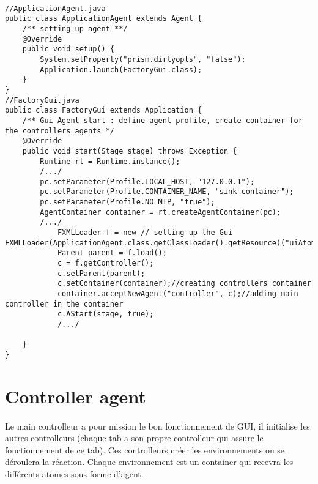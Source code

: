 \usetikzlibrary{arrows.meta}


\begin{lstlisting}

//ApplicationAgent.java
public class ApplicationAgent extends Agent {
    /** setting up agent **/
    @Override
    public void setup() {
        System.setProperty("prism.dirtyopts", "false");
        Application.launch(FactoryGui.class);
    }
}
//FactoryGui.java
public class FactoryGui extends Application {
    /** Gui Agent start : define agent profile, create container for the controllers agents */
    @Override
    public void start(Stage stage) throws Exception {
        Runtime rt = Runtime.instance();
        /.../
        pc.setParameter(Profile.LOCAL_HOST, "127.0.0.1");
        pc.setParameter(Profile.CONTAINER_NAME, "sink-container");
        pc.setParameter(Profile.NO_MTP, "true");
        AgentContainer container = rt.createAgentContainer(pc);
        /.../
            FXMLLoader f = new // setting up the Gui FXMLLoader(ApplicationAgent.class.getClassLoader().getResource(("uiAtoms.fxml")));
            Parent parent = f.load();
            c = f.getController();
            c.setParent(parent);
            c.setContainer(container);//creating controllers container
            container.acceptNewAgent("controller", c);//adding main controller in the container
            c.AStart(stage, true);
            /.../

    }
}
\end{lstlisting}

\section{Controller agent}
\paragraph{}
Le main controlleur a pour mission le bon fonctionnement de GUI, il initialise les autres controlleurs (chaque tab a son propre controlleur qui assure le fonctionnement de ce tab). Ces controlleurs créer les environnements ou se déroulera la réaction. Chaque environnement est un container qui recevra les différents atomes sous forme d'agent.



